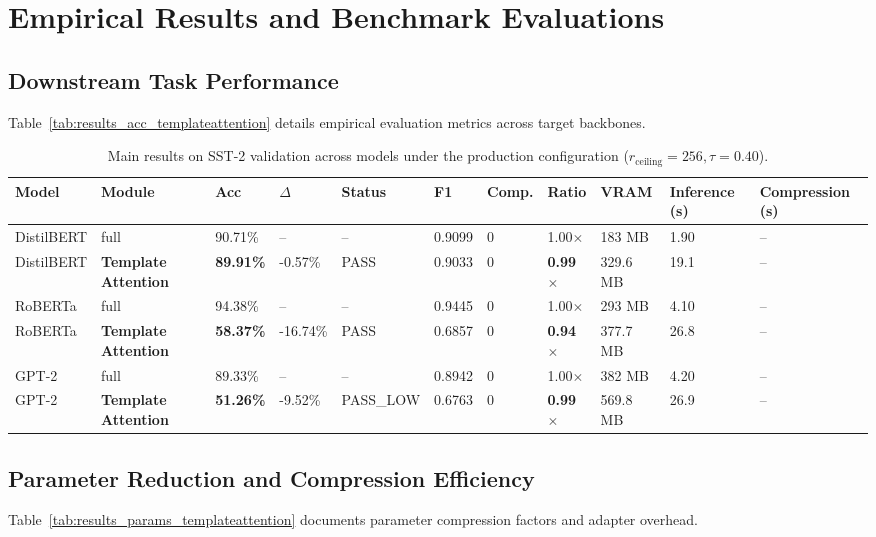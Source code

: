 \section{Empirical Results and Benchmark Evaluations}

\subsection{Downstream Task Performance}
Table~\ref{tab:results_acc_templateattention} details empirical evaluation metrics across target backbones.

\begin{table}[t]
\centering
\small
\begin{tabular}{lllllllllll}
\toprule
\textbf{Model} & \textbf{Module} & \textbf{Acc} & \textbf{$\Delta$} & \textbf{Status} & \textbf{F1} & \textbf{Comp.} & \textbf{Ratio} & \textbf{VRAM} & \textbf{Inference (s)} & \textbf{Compression (s)} \\
\midrule
DistilBERT & full & 90.71\% & -- & -- & 0.9099 & 0 & 1.00$\times$ & 183 MB & 1.90 & -- \\
DistilBERT & \textbf{Template Attention} & \textbf{89.91\%} & -0.57\% & PASS & 0.9033 & 0 & \textbf{0.99$\times$} & 329.6 MB & 19.1 & -- \\
RoBERTa & full & 94.38\% & -- & -- & 0.9445 & 0 & 1.00$\times$ & 293 MB & 4.10 & -- \\
RoBERTa & \textbf{Template Attention} & \textbf{58.37\%} & -16.74\% & PASS & 0.6857 & 0 & \textbf{0.94$\times$} & 377.7 MB & 26.8 & -- \\
GPT-2 & full & 89.33\% & -- & -- & 0.8942 & 0 & 1.00$\times$ & 382 MB & 4.20 & -- \\
GPT-2 & \textbf{Template Attention} & \textbf{51.26\%} & -9.52\% & PASS_LOW & 0.6763 & 0 & \textbf{0.99$\times$} & 569.8 MB & 26.9 & -- \\
\bottomrule
\end{tabular}
\caption{Main results on SST-2 validation across models under the production configuration ($r_{\mathrm{ceiling}}=256, \tau=0.40$).}
\label{tab:main_sst2}
\end{table}

\subsection{Parameter Reduction and Compression Efficiency}
Table~\ref{tab:results_params_templateattention} documents parameter compression factors and adapter overhead.

